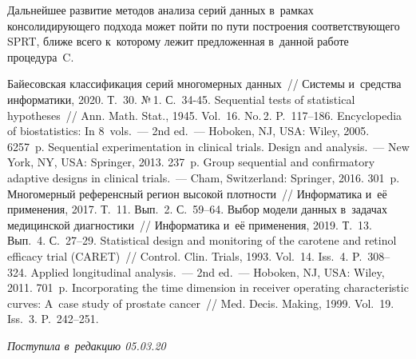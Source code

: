 \begin{multicols}{2}
     Дальнейшее развитие методов анализа серий данных в~рамках 
консолидирующего подхода может пойти по пути построения 
соответствующего SPRT, 
ближе всего к~которому лежит предложенная в~данной работе процедура~C.
     
{\small\frenchspacing
 {%
 \begin{thebibliography}{99}

 Байесовская классификация серий многомерных данных~// 
Системы и~средства информатики, 2020. Т.~30. №\,1. С.~34-45.
 Sequential tests of statistical hypotheses~// Ann. Math. Stat., 
1945. Vol.~16. No.\,2. P.~117--186.
 Encyclopedia of biostatistics: In 8~vols.~--- 2nd ed.~--- 
Hoboken, NJ, USA: Wiley, 2005. 6257~p.
 Sequential experimentation in clinical trials. Design 
and analysis.~--- New York, NY, USA: Springer, 2013. 237~p.
 Group sequential and confirmatory adaptive designs in 
clinical trials.~--- Cham, Switzerland: Springer, 2016. 301~p.
 Многомерный референсный регион высокой плотности~// 
Информатика и~её применения, 2017. Т.~11. Вып.~2. С.~59--64.
 Выбор модели данных в~задачах медицинской диагностики~// 
Информатика и~её применения, 2019. Т.~13. Вып.~4. С.~27--29.
Statistical design and monitoring of the carotene and 
retinol efficacy trial (CARET)~// Control. Clin. Trials, 1993. Vol.~14. Iss.~4. P.~308--
324.
 Applied longitudinal analysis.~--- 2nd 
ed.~--- Hoboken, NJ, USA: Wiley, 2011. 701~p.
 Incorporating the time 
dimension in receiver operating characteristic curves: A~case study of prostate cancer~// 
Med. Decis. Making, 1999. Vol.~19. Iss.~3. P.~242--251.
\end{thebibliography}

 }
 }

\end{multicols}


\hfill{\small\textit{Поступила в~редакцию 05.03.20}}

